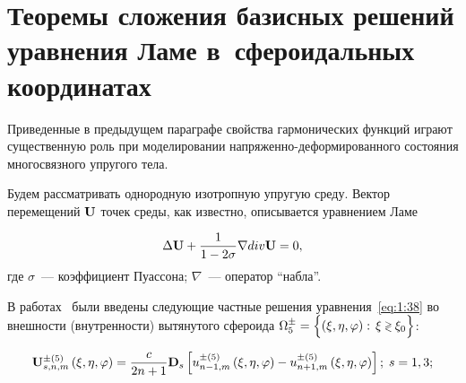 %

\section{Теоремы сложения базисных решений уравнения Ламе в~сфероидальных координатах}

Приведенные в предыдущем параграфе свойства гармонических функций играют существенную роль при моделировании на\-пря\-жен\-но-де\-фор\-ми\-ро\-ван\-но\-го состояния многосвязного упругого тела.

Будем рассматривать однородную изотропную упругую среду. Вектор перемещений ${\bf{U}}$ точек среды, как известно, описывается уравнением Ламе

\begin{equation}\label{eq:1:38}
\Delta {\bf{U}} + \frac{1}{{1 - 2\sigma }}\nabla div{\bf{U}} = 0,
\end{equation}
\noindent где $\sigma$~--- коэффициент Пуассона; $\nabla$~--- оператор ``набла''.

В работах~\cite{Nikolaev1993,Nikolaev1984} были введены следующие частные решения уравнения~\eqref{eq:1:38} во внешности (внутренности) вытянутого сфероида $\Omega _5^ \pm = \Big\{ {(\xi ,\eta ,\varphi ): \- {\mkern 1mu} {\kern 1pt} \xi  \mathbin{\lower.3ex\hbox{$\buildrel>\over
{\smash{\scriptstyle<}\vphantom{_x}}$}} {\xi _0}} \Big\}$:

\begin{equation}\label{eq:1:39}
{\bf{U}}_{s,n,m}^{ \pm (5)}\left( {\xi ,\eta ,\varphi } \right) = \frac{c}{{2n + 1}}{{\bf{D}}_s}\left[ {u_{n - 1,m}^{ \pm (5)}\left( {\xi ,\eta ,\varphi } \right) - u_{n + 1,m}^{ \pm (5)}\left( {\xi ,\eta ,\varphi } \right)} \right];\,{\kern 1pt} s = 1,3;
\end{equation}

